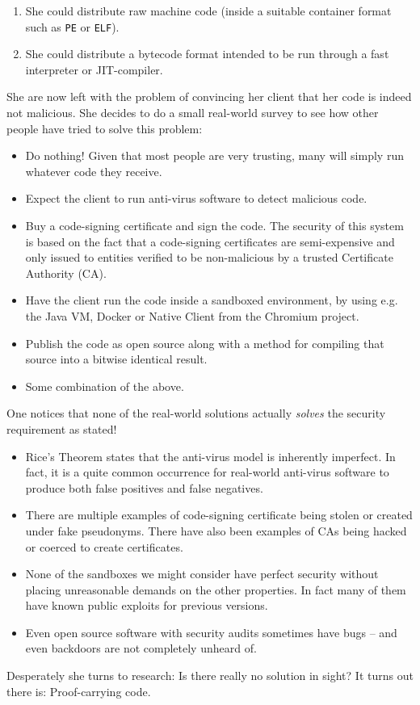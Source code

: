 \begin{enumerate}
\item She could distribute raw machine code (inside a suitable container format
  such as \texttt{PE} or \texttt{ELF}).
\item She could distribute a bytecode format intended to be run through a fast
  interpreter or JIT-compiler.
\end{enumerate}

She are now left with the problem of convincing her client that her code is
indeed not malicious. She decides to do a small real-world survey to see how
other people have tried to solve this problem:

\begin{itemize}
\item Do nothing! Given that most people are very trusting, many will simply run
  whatever code they receive.
\item Expect the client to run anti-virus software to detect malicious code.
\item Buy a code-signing certificate and sign the code. The security of this
  system is based on the fact that a code-signing certificates are
  semi-expensive and only issued to entities verified to be non-malicious by a
  trusted Certificate Authority (CA).
\item Have the client run the code inside a sandboxed environment, by using
  e.g. the Java VM, Docker or Native Client from the Chromium project.
\item Publish the code as open source along with a method for compiling that
  source into a bitwise identical result.
\item Some combination of the above.
\end{itemize}

One notices that none of the real-world solutions actually \emph{solves} the
security requirement as stated!

\begin{itemize}
\item Rice's Theorem states that the anti-virus model is inherently
  imperfect. In fact, it is a quite common occurrence for real-world anti-virus
  software to produce both false positives and false negatives.
\item There are multiple examples of code-signing certificate being stolen or
  created under fake pseudonyms. There have also been examples of CAs being
  hacked or coerced to create certificates.
\item None of the sandboxes we might consider have perfect security without
  placing unreasonable demands on the other properties. In fact many of them
  have known public exploits for previous versions.
\item Even open source software with security audits sometimes have bugs -- and
  even backdoors are not completely unheard of.
\end{itemize}

Desperately she turns to research: Is there really no solution in sight? It
turns out there is: Proof-carrying code.

